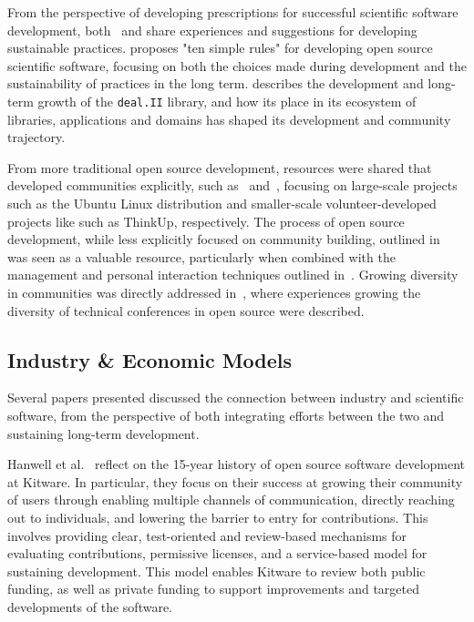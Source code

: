 \documentclass[11pt, oneside]{amsart}
\newcommand{\toolname}[1] {\textsf{#1}}
\begin{document}
From the perspective of developing prescriptions for successful scientific
software development, both~\cite{citeulike:11831265} and
\cite{1749-4699-6-1-015010} share experiences and suggestions for developing
sustainable practices.  \cite{citeulike:11831265} proposes "ten simple rules"
for developing open source scientific software, focusing on both the choices
made during development and the sustainability of practices in the long term.  
\cite{1749-4699-6-1-015010} describes the development and long-term growth of
the \texttt{deal.II} library, and how its place in its ecosystem of libraries,
applications and domains has shaped its development and community trajectory.

From more traditional open source development, resources were shared that
developed communities explicitly, such as~\cite{citeulike:7888211}
and~\cite{Trapani:2011}, focusing on large-scale projects such as the Ubuntu
Linux distribution and smaller-scale volunteer-developed projects like such as
ThinkUp, respectively. The process of open source development, while less
explicitly focused on community building, outlined in~\cite{citeulike:478633}
was seen as a valuable resource, particularly when combined with the management
and personal interaction techniques outlined in~\cite{opac-b1134063}.  Growing
diversity in communities was directly addressed in~\cite{Allsopp:2012}, where
experiences growing the diversity of technical conferences in open source were
described.

\subsection{Industry \& Economic Models}

Several papers presented discussed the connection between industry and
scientific software, from the perspective of both integrating efforts between
the two and sustaining long-term development.

Hanwell et al.~\cite{Hanwell_WSSSPE} reflect on the 15-year history of open
source software development at \toolname{Kitware}.  In particular, they focus on their
success at growing their community of users through enabling multiple channels
of communication, directly reaching out to individuals, and lowering the
barrier to entry for contributions. This involves providing clear,
test-oriented and review-based mechanisms for evaluating contributions,
permissive licenses, and a service-based model for sustaining development.
This model enables \toolname{Kitware} to review both public funding, as well as private
funding to support improvements and targeted developments of the software.
\end{document}
